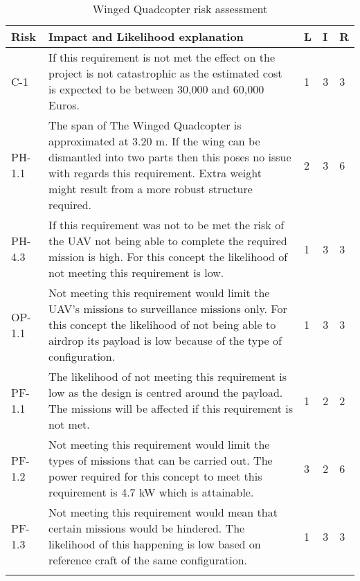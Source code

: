 \begin{table}[]
    \centering
    \caption{Winged Quadcopter risk assessment}
    \label{tab:wing_quad_risk_asse}
    \begin{tabularx}{\textwidth}{l L l l l}
        \toprule
        Risk            & Impact and Likelihood explanation               & L     & I     & R
        \\ \midrule
        C-1             & If this requirement is not met the effect on the project is not catastrophic as the estimated cost is expected to be between 30,000 and 60,000 Euros.        & 1     & 3     & 3
        \\ \hdashline
        PH-1.1          & The span of The Winged Quadcopter is approximated at 3.20 m. If the wing can be dismantled into two parts then this poses no issue with regards this requirement. Extra weight might result from a more robust structure required.                           & 2     & 3     & 6
        \\ \hdashline
        PH-4.3          & If this requirement was not to be met the risk of the UAV not being able to complete the required mission is high. For this concept the likelihood of not meeting this requirement is low.                                                                                 & 1      & 3     & 3
        \\ \hdashline
        OP-1.1          & Not meeting this requirement would limit the UAV's missions to surveillance missions only. For this concept the likelihood of not being able to airdrop its payload is low because of the type of configuration.                                                       & 1     & 3     & 3
        \\ \hdashline
        PF-1.1          & The likelihood of not meeting this requirement is low as the design is centred around the payload. The missions will be affected if this requirement is not met.   & 1 & 2     & 2
        \\ \hdashline
        PF-1.2          & Not meeting this requirement would limit the types of missions that can be carried out. The power required for this concept to meet this requirement is 4.7 kW which is attainable. & 3 & 2 & 6
        \\ \hdashline
        PF-1.3          & Not meeting this requirement would mean that certain missions would be hindered. The likelihood of this happening is low based on reference craft of the same configuration. & 1 & 3 & 3        
        \\ \hdashline

\end{tabularx}
\end{table}
